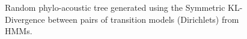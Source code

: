\documentclass[pdftex,11pt,a4paper]{article}
\theoremstyle{definition}
\theoremstyle{remark}
\begin{document}
\begin{figure}
\noindent{}
    \caption{Random phylo-acoustic tree generated using the Symmetric KL-Divergence between pairs of transition models (Dirichlets) from HMMs.}
    \label{fig:rhmmunweighted}
\end{figure}
\end{document}
